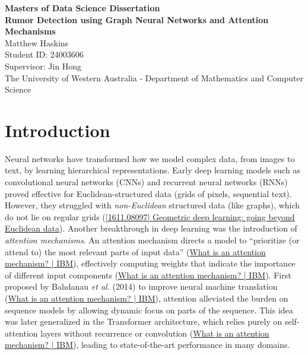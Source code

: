 \documentclass[12pt,a4paper]{report}
\begin{document}
\begin{titlepage}
    \centering
    {\Large \textbf{Masters of Data Science Dissertation}}\\[1.5cm]
    {\huge \textbf{Rumor Detection using Graph Neural Networks and Attention Mechanisms}}\\[1.5cm]
    {\Large Matthew Haskins}\\[0.5cm]
    Student ID: 24003606\\[0.5cm]
    Supervisor: Jin Hong\\[1cm]
    The University of Western Australia - Department of Mathematics and Computer Science\\[2cm]
\end{titlepage}

\tableofcontents
\newpage

\chapter{Introduction}

Neural networks have transformed how we model complex data, from images to text, by learning hierarchical representations. Early deep learning models such as convolutional neural networks (CNNs) and recurrent neural networks (RNNs) proved effective for Euclidean-structured data (grids of pixels, sequential text). However, they struggled with \textit{non-Euclidean} structured data (like graphs), which do not lie on regular grids (\href{https://arxiv.org/abs/1611.08097#:~:text=Euclidean%20or%20grid,directions%20in%20this%20nascent%20field}{[1611.08097] Geometric deep learning: going beyond Euclidean data}). Another breakthrough in deep learning was the introduction of \textit{attention mechanisms}. An attention mechanism directs a model to “prioritize (or attend to) the most relevant parts of input data” (\href{https://www.ibm.com/think/topics/attention-mechanism#:~:text=An%20attention%20mechanism%20is%20a,power%20popular%20applications%20like%20ChatGPT}{What is an attention mechanism? | IBM}), effectively computing weights that indicate the importance of different input components (\href{https://www.ibm.com/think/topics/attention-mechanism#:~:text=Mathematically%20speaking%2C%20an%20attention%20mechanism,a%20large%20dataset%20of%20examples}{What is an attention mechanism? | IBM}). First proposed by Bahdanau \textit{et al.} (2014) to improve neural machine translation (\href{https://www.ibm.com/think/topics/attention-mechanism#:~:text=Attention%20mechanisms%20were%20originally%20introduced,captioning%20and%20visual%20question%20answering}{What is an attention mechanism? | IBM}), attention alleviated the burden on sequence models by allowing dynamic focus on parts of the sequence. This idea was later generalized in the Transformer architecture, which relies purely on self-attention layers without recurrence or convolution (\href{https://www.ibm.com/think/topics/attention-mechanism#:~:text=In%202017%2C%20the%20seminal%20paper,ongoing%20era%20of%20generative%20AI}{What is an attention mechanism? | IBM}), leading to state-of-the-art performance in many domains.
\end{document}

